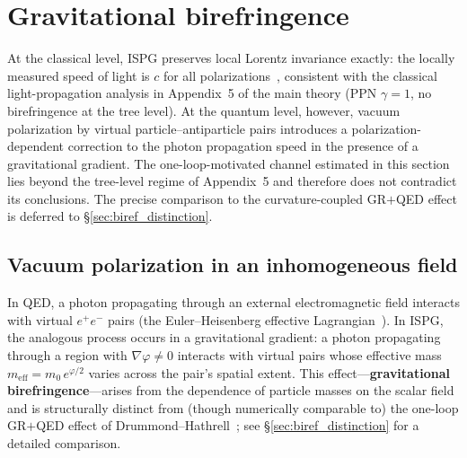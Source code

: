 \documentclass[aps,prd,onecolumn,superscriptaddress,nofootinbib,showpacs,12pt,notitlepage]{revtex4-2}
\newcommand{\meff}{m_{\mathrm{eff}}}
\begin{document}
\section{Gravitational birefringence}\label{sec:birefringence}

At the classical level, ISPG preserves local Lorentz invariance
exactly: the locally measured speed of light is $c$ for all
polarizations~\cite{Lotishvili2026}, consistent with the
classical light-propagation analysis in Appendix~5 of the
main theory (PPN $\gamma=1$, no birefringence at the
tree level).  At the quantum level, however, vacuum
polarization by virtual particle--antiparticle
pairs introduces a polarization-dependent correction to the
photon propagation speed in the presence of a gravitational
gradient.  The one-loop-motivated channel estimated in this section
lies beyond the tree-level regime of Appendix~5 and
therefore does not contradict its conclusions.  The
precise comparison to the curvature-coupled GR$+$QED
effect is deferred to \S\ref{sec:biref_distinction}.

\subsection{Vacuum polarization in an inhomogeneous field}
\label{sec:vac_pol}

In QED, a photon propagating through an external electromagnetic
field interacts with virtual $e^+e^-$ pairs (the Euler--Heisenberg
effective Lagrangian~\cite{EulerHeisenberg1936}).  In ISPG, the
analogous process occurs in a gravitational gradient:
a photon propagating through a region with $\nabla\varphi \neq 0$
interacts with virtual pairs whose effective mass
$\meff = m_0\,e^{\varphi/2}$ varies across the pair's
spatial extent.  This effect---\textbf{gravitational
birefringence}---arises from the dependence of particle
masses on the scalar field and is structurally distinct
from (though numerically comparable to) the one-loop
GR$+$QED effect of
Drummond--Hathrell~\cite{DrummondHathrell1980}; see
\S\ref{sec:biref_distinction} for a detailed comparison.
\end{document}
